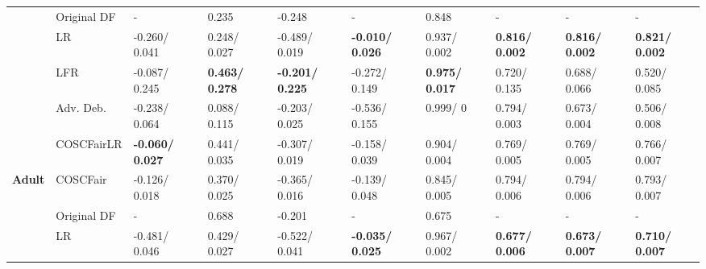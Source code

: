 \begin{table*}[h!]
{\begin{minipage}{\textwidth}
\begin{tabular}{|c|l|l|l|l|l|l|l|l|l|}
                                        & Original DF                        & -                      & 0.235                 & -0.248                 & -                      & 0.848                 & -                     & -                     & -                     \\ \cline{2-10} 
                                        & LR                                 & -0.260/ 0.041          & 0.248/ 0.027          & -0.489/ 0.019          & \textbf{-0.010/ 0.026} & 0.937/ 0.002          & \textbf{0.816/ 0.002} & \textbf{0.816/ 0.002} & \textbf{0.821/ 0.002} \\ \cline{2-10} 
                                        & LFR                                & -0.087/ 0.245          & \textbf{0.463/ 0.278} & \textbf{-0.201/ 0.225} & -0.272/ 0.149          & \textbf{0.975/ 0.017} & 0.720/ 0.135          & 0.688/ 0.066          & 0.520/ 0.085          \\ \cline{2-10} 
                                        & Adv. Deb.                          & -0.238/ 0.064          & 0.088/ 0.115          & -0.203/ 0.025          & -0.536/ 0.155          & 0.999/ 0              & 0.794/ 0.003          & 0.673/ 0.004          & 0.506/ 0.008          \\ \cline{2-10} 
                                        & \cellcolor[HTML]{D9D9D9}COSCFairLR & \textbf{-0.060/ 0.027} & 0.441/ 0.035          & -0.307/ 0.019          & -0.158/ 0.039          & 0.904/ 0.004          & 0.769/ 0.005          & 0.769/ 0.005          & 0.766/ 0.007          \\ \cline{2-10} 
\multirow{-6}{*}{\textbf{Adult}}        & \cellcolor[HTML]{D9D9D9}COSCFair   & -0.126/ 0.018          & 0.370/ 0.025          & -0.365/ 0.016          & -0.139/ 0.048          & 0.845/ 0.005          & 0.794/ 0.006          & 0.794/ 0.006          & 0.793/ 0.007          \\ \hline
                                        & Original DF                        & -                      & 0.688                 & -0.201                 & -                      & 0.675                 & -                     & -                     & -                     \\ \cline{2-10} 
                                        & LR                                 & -0.481/ 0.046          & 0.429/ 0.027          & -0.522/ 0.041          & \textbf{-0.035/ 0.025} & 0.967/ 0.002          & \textbf{0.677/ 0.006} & \textbf{0.673/ 0.007} & \textbf{0.710/ 0.007} \\ \cline{2-10} 

\end{tabular}
\end{minipage}}
\end{table*}
